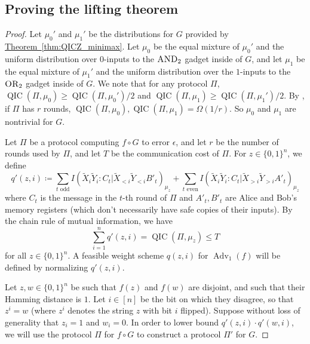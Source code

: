 \documentclass[10pt,a4paper]{article}
\theoremstyle{definition}
\newcommand{\thm}[1]{\hyperref[thm:#1]{Theorem~\ref*{thm:#1}}}
\newcommand{\B}{\{0,1\}}
\renewcommand{\>}{\rangle}
\newcommand{\<}{\langle}
\newcommand{\tX}{\widetilde{X}}
\newcommand{\tY}{\widetilde{Y}}
\newcommand{\OR}{\textsc{OR}}
\newcommand{\AND}{\textsc{AND}}
\DeclareMathOperator{\Adv}{Adv}
\DeclareMathOperator{\QIC}{QIC}
\begin{document}
\subsection{Proving the lifting theorem}

\Advliftformal*

\begin{proof}
Let $\mu_0'$ and $\mu_1'$ be the distributions
for $G$ provided by \thm{QICZ_minimax}. Let $\mu_0$
be the equal mixture of $\mu_0'$ and the uniform distribution
over $0$-inputs to the $\AND_2$ gadget inside of $G$,
and let $\mu_1$ be the equal mixture of $\mu_1'$ and the
uniform distribution over the $1$-inputs to the $\OR_2$ gadget
inside of $G$. We note that for any protocol $\Pi$,
$\QIC(\Pi,\mu_0)\ge \QIC(\Pi,\mu_0')/2$ and
$\QIC(\Pi,\mu_1)\ge \QIC(\Pi,\mu_1')/2$. By \cite{BGK+18}, if $\Pi$ has $r$ rounds,
$\QIC(\Pi,\mu_0),\QIC(\Pi,\mu_1)=\Omega(1/r)$. So $\mu_0$ and $\mu_1$ are nontrivial for $G$.

Let $\Pi$ be a protocol computing $f\circ G$ to error $\epsilon$,
and let $r$ be the number of rounds used by $\Pi$,
and let $T$ be the communication cost of $\Pi$.
For $z\in\B^n$, we define 
\[ q'(z,i)\coloneqq \sum_{t \text{ odd}}I(\tX_i\tY_i:C_t|\tX_{<i}\tY_{<i}B'_t)_{\mu_z} + \sum_{t\text{ even}}I(\tX_i\tY_i:C_t|\tX_{>i}\tY_{>i}A'_t)_{\mu_z}\]
where $C_t$ is the message in the $t$-th round of $\Pi$ and $A'_t, B'_t$ are Alice and Bob's memory registers (which don't necessarily have safe copies of their inputs). By the chain rule of mutual information, we have
\[\sum_{i=1}^n q'(z,i) = \QIC(\Pi, \mu_z) \leq T\]
for all $z\in\B^n$. A feasible weight scheme $q(z,i)$ for $\Adv_1(f)$ will be defined by normalizing $q'(z,i)$.

Let $z,w\in\B^n$ be such that $f(z)$ and $f(w)$ are disjoint,
and such that their Hamming distance is $1$. Let
$i\in[n]$ be the bit on which they disagree, so that
$z^i=w$ (where $z^i$ denotes the string $z$ with bit $i$ flipped).
Suppose without loss of generality that $z_i=1$ and $w_i=0$.
In order to lower bound $q'(z,i)\cdot q'(w,i)$, we will use the protocol $\Pi$ for $f\circ G$ to construct a protocol $\Pi'$ for $G$.


\end{proof}
\end{document}
